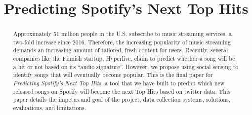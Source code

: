 \documentclass[12pt,conference]{IEEEtran}
\begin{document}
\title{Predicting Spotify's Next Top Hits}

\author{
\and
{}
\and
{}
\and
}

\maketitle


\begin{abstract}
Approximately 51 million people in the U.S. subscribe to music streaming services, a two-fold increase since 2016. Therefore, the increasing popularity of music streaming demands an increasing amount of tailored, fresh content for users. Recently, several companies like the Finnish startup, Hyperlive, claim to predict whether a song will be a hit or not based on its “audio signature”. However, we propose using social sensing to identify songs that will eventually become popular. This is the final paper for \textit{Predicting Spotify's Next Top Hits}, a tool that we have built to predict which new released songs on Spotify will become the next Top Hits based on twitter data. This paper details the impetus and goal of the project, data collection systems, solutions, evaluations, and limitations.
\end{abstract}
\end{document}

